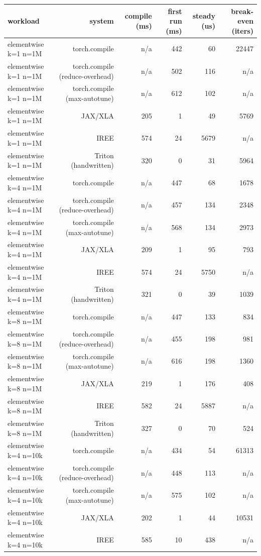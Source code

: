 \begin{tabular}{lrrrrr}
\toprule
workload & system & compile (ms) & first run (ms) & steady (us) & break-even (iters) \\
\midrule
elementwise k=1 n=1M & torch.compile & n/a & 442 & 60 & 22447 \\
elementwise k=1 n=1M & torch.compile (reduce-overhead) & n/a & 502 & 116 & n/a \\
elementwise k=1 n=1M & torch.compile (max-autotune) & n/a & 612 & 102 & n/a \\
elementwise k=1 n=1M & JAX/XLA & 205 & 1 & 49 & 5769 \\
elementwise k=1 n=1M & IREE & 574 & 24 & 5679 & n/a \\
elementwise k=1 n=1M & Triton (handwritten) & 320 & 0 & 31 & 5964 \\
elementwise k=4 n=1M & torch.compile & n/a & 447 & 68 & 1678 \\
elementwise k=4 n=1M & torch.compile (reduce-overhead) & n/a & 457 & 134 & 2348 \\
elementwise k=4 n=1M & torch.compile (max-autotune) & n/a & 568 & 134 & 2973 \\
elementwise k=4 n=1M & JAX/XLA & 209 & 1 & 95 & 793 \\
elementwise k=4 n=1M & IREE & 574 & 24 & 5750 & n/a \\
elementwise k=4 n=1M & Triton (handwritten) & 321 & 0 & 39 & 1039 \\
elementwise k=8 n=1M & torch.compile & n/a & 447 & 133 & 834 \\
elementwise k=8 n=1M & torch.compile (reduce-overhead) & n/a & 455 & 198 & 981 \\
elementwise k=8 n=1M & torch.compile (max-autotune) & n/a & 616 & 198 & 1360 \\
elementwise k=8 n=1M & JAX/XLA & 219 & 1 & 176 & 408 \\
elementwise k=8 n=1M & IREE & 582 & 24 & 5887 & n/a \\
elementwise k=8 n=1M & Triton (handwritten) & 327 & 0 & 70 & 524 \\
elementwise k=4 n=10k & torch.compile & n/a & 434 & 54 & 61313 \\
elementwise k=4 n=10k & torch.compile (reduce-overhead) & n/a & 448 & 113 & n/a \\
elementwise k=4 n=10k & torch.compile (max-autotune) & n/a & 575 & 102 & n/a \\
elementwise k=4 n=10k & JAX/XLA & 202 & 1 & 44 & 10531 \\
elementwise k=4 n=10k & IREE & 585 & 10 & 438 & n/a \\

\end{tabular}
